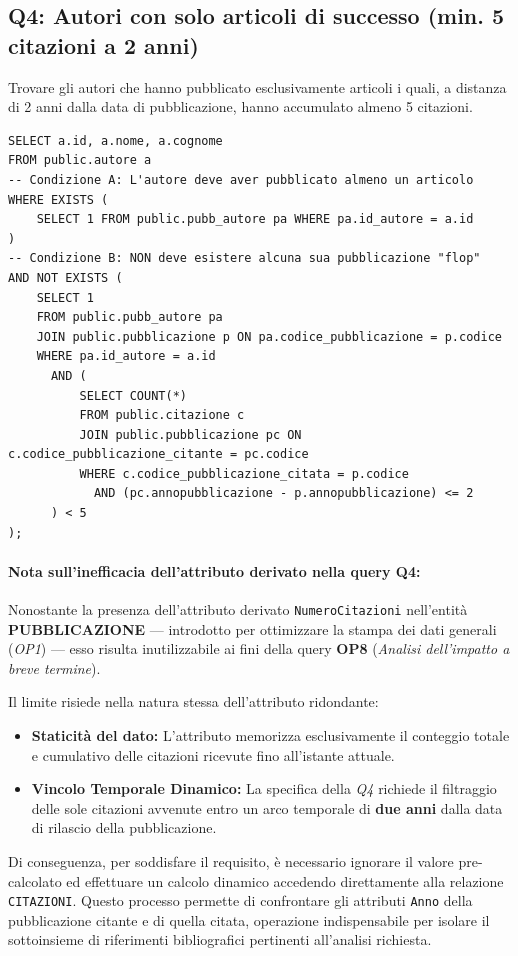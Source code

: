 \documentclass[a4paper,12pt]{article}
\begin{document}
\subsection*{Q4: Autori con solo articoli di successo (min. 5 citazioni a 2 anni)}
Trovare gli autori che hanno pubblicato esclusivamente articoli i quali, a distanza di 2 anni dalla data di pubblicazione, hanno accumulato almeno 5 citazioni.
\begin{lstlisting}
SELECT a.id, a.nome, a.cognome
FROM public.autore a
-- Condizione A: L'autore deve aver pubblicato almeno un articolo
WHERE EXISTS (
    SELECT 1 FROM public.pubb_autore pa WHERE pa.id_autore = a.id
)
-- Condizione B: NON deve esistere alcuna sua pubblicazione "flop"
AND NOT EXISTS (
    SELECT 1
    FROM public.pubb_autore pa
    JOIN public.pubblicazione p ON pa.codice_pubblicazione = p.codice
    WHERE pa.id_autore = a.id
      AND (
          SELECT COUNT(*)
          FROM public.citazione c
          JOIN public.pubblicazione pc ON c.codice_pubblicazione_citante = pc.codice
          WHERE c.codice_pubblicazione_citata = p.codice
            AND (pc.annopubblicazione - p.annopubblicazione) <= 2
      ) < 5
);
\end{lstlisting}

\paragraph{Nota sull'inefficacia dell'attributo derivato nella query Q4:}
Nonostante la presenza dell'attributo derivato \texttt{NumeroCitazioni} nell'entità \textbf{PUBBLICAZIONE} --- introdotto per ottimizzare la stampa dei dati generali (\textit{OP1}) --- esso risulta inutilizzabile ai fini della query \textbf{OP8} (\textit{Analisi dell'impatto a breve termine}).

Il limite risiede nella natura stessa dell'attributo ridondante:
\begin{itemize}
    \item \textbf{Staticità del dato:} L'attributo memorizza esclusivamente il conteggio totale e cumulativo delle citazioni ricevute fino all'istante attuale.
    \item \textbf{Vincolo Temporale Dinamico:} La specifica della \textit{Q4} richiede il filtraggio delle sole citazioni avvenute entro un arco temporale di \textbf{due anni} dalla data di rilascio della pubblicazione.
\end{itemize}

Di conseguenza, per soddisfare il requisito, è necessario ignorare il valore pre-calcolato ed effettuare un calcolo dinamico accedendo direttamente alla relazione \texttt{CITAZIONI}. Questo processo permette di confrontare gli attributi \texttt{Anno} della pubblicazione citante e di quella citata, operazione indispensabile per isolare il sottoinsieme di riferimenti bibliografici pertinenti all'analisi richiesta.
\end{document}
